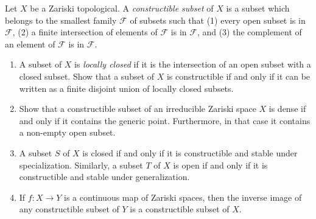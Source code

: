 \begin{exercise}
	Let $X$ be a Zariski topological. A \textit{constructible subset} of $X$ is a subset which belongs to the smallest family $\mathcal{F}$ of subsets such that (1) every open subset is in $\mathcal{F}$, (2) a finite intersection of elements of $\mathcal{F}$ is in $\mathcal{F}$, and (3) the complement of an element of $\mathcal{F}$ is in $\mathcal{F}$.
	\begin{enumerate}
		\item A subset of $X$ is \textit{locally closed} if it is the intersection of an open subset with a closed subset. Show that a subset of $X$ is constructible if and only if it can be written as a finite disjoint union of locally closed subsets.
		\item Show that a constructible subset of an irreducible Zariski space $X$ is dense if and only if it contains the generic point. Furthermore, in that case it contains a non-empty open subset.
		\item A subset $S $ of $X $ is closed if and only if it is constructible and stable under specialization. Similarly, a subset $T $ of $X $ is open if and only if it is constructible and stable under generalization.
		\item If $f:X \to Y$ is a continuous map of Zariski spaces, then the inverse image of any constructible subset of $Y$ is a constructible subset of $X$. 
	\end{enumerate}
\end{exercise}
